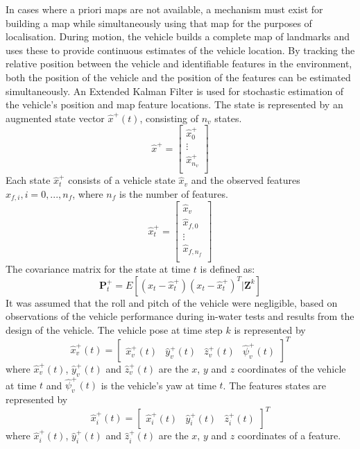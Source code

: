 In cases where a priori maps are not available, a mechanism must exist for building a map while simultaneously using that map for the purposes of localisation.
During motion, the vehicle builds a complete map of landmarks and uses these to provide continuous estimates of the vehicle location.
By tracking the relative position between the vehicle and identifiable features in the environment, both the position of the vehicle and the position of the features can be estimated simultaneously.
An Extended Kalman Filter is used for stochastic estimation of the vehicle's position and map feature locations.
The state is represented by an augmented state vector $\hat{x}^{+}(t)$, consisting of $n_v$ states.
\begin{equation}
\hat{x}^+ = \left[ {
\begin{array}{c} \hat{x}_0^+ \\ \vdots \\ \hat{x}_{n_v}^+ \\  \end{array}
} \right]
\end{equation}
Each state $\hat{x}_t^+$ consists of a vehicle state $\hat{x}_v$ and the observed features $\hat{x}_{f, i}, i = 0, ..., n_f$, where $n_f$ is the number of features.
\begin{equation}
\hat{x}_t^+ = \left[ {
\begin{array}{c} \hat{x}_v \\ \hat{x}_{f, 0} \\ \vdots \\ \hat{x}_{f, n_f} \\  \end{array}
} \right]
\end{equation}
The covariance matrix for the state at time $t$ is defined as:
\begin{equation}
\textbf{P}^+_t = E[(x_t - \hat{x}^+_t)(x_t - \hat{x}^+_t)^T | \textbf{Z}^k]
\end{equation}
It was assumed that the roll and pitch of the vehicle were negligible, based on observations of the vehicle performance during in-water tests and results from the design of the vehicle.
The vehicle pose at time step $k$ is represented by
\begin{equation}
\hat{x}^+_v(t) = \left[ \begin{array}{cccc} \hat{\textit{x}}^+_v(t) & \hat{\textit{y}}^+_v(t) & \hat{\textit{z}}^+_v(t) & \hat{\psi}^+_v(t) \end{array}\right]^T
\end{equation}
where $\hat{\textit{x}}^+_v(t)$, $\hat{\textit{y}}^+_v(t)$ and $\hat{\textit{z}}^+_v(t)$ are the $x$, $y$ and $z$ coordinates of the vehicle at time $t$ and $\hat{\psi}^+_v(t)$ is the vehicle's yaw at time $t$.
The features states are represented by
\begin{equation}
\hat{x}^+_i(t) = \left[ \begin{array}{ccc} \hat{\textit{x}}^+_i(t) & \hat{\textit{y}}^+_i(t) & \hat{\textit{z}}^+_i(t) \end{array}\right]^T
\end{equation}
where $\hat{\textit{x}}^+_i(t)$, $\hat{\textit{y}}^+_i(t)$ and $\hat{\textit{z}}^+_i(t)$ are the $x$, $y$ and $z$ coordinates of a feature.

